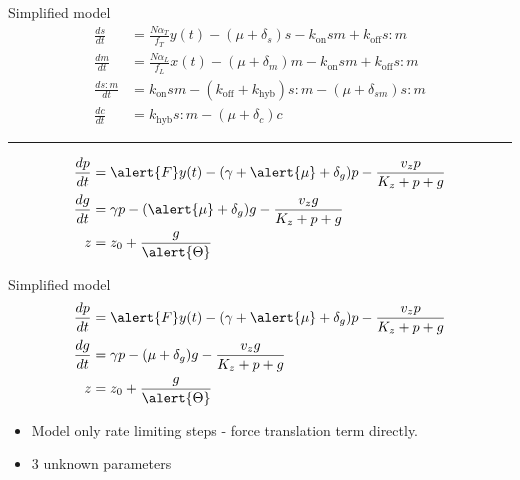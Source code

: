 \documentclass{beamer}
\newenvironment{greyedout}{\color{gray}}{\ignorespacesafterend}
\begin{document}
\small
\begin{frame}{Simplified model}
\begin{greyedout}
\begin{align*} 
\frac{ds}{dt} &= \frac{N\alpha_{T}}{f_{T}} y(t)-(\mu + \delta_{s})s -k_{\mathrm{on}}sm +k_{\mathrm{off}}s:m \\
\frac{dm}{dt} &=  \frac{N\alpha_{L}}{f_{L}}x(t)-(\mu + \delta_{m})m -k_{\mathrm{on}}sm +k_{\mathrm{off}}s:m  \\
\frac{ds:m}{dt} & = k_{\mathrm{on}}sm  - (k_{\mathrm{off}}+ k_{\mathrm{hyb}})s:m  -(\mu + \delta_{sm} )s:m \\
\frac{dc}{dt} & = k_{\mathrm{hyb}}s:m  -(\mu + \delta_{c})c  
\end{align*}
\end{greyedout}
\begin{center}
\rule{0.5\textwidth}{.4pt}
\end{center}
\begin{align*} 
\frac{dp}{dt} & = \alert{F}y(t)-(\gamma + \alert{\mu} + \delta_{g})p - \frac{v_{z}p}{K_{z}+p+g}   \\
\frac{dg}{dt} & = \gamma p - (\alert{\mu} + \delta_{g})g - \frac{v_{z}g}{K_{z}+p+g}  \\
z &= z_{0} +\frac{g}{\alert{\Theta}}  
\end{align*}
\end{frame}
\normalsize



\begin{frame}{Simplified model}
\begin{align}
\frac{dp}{dt} & = \alert{F}y(t)-(\gamma + \alert{\mu} + \delta_{g})p - \frac{v_{z}p}{K_{z}+p+g}   \\
\frac{dg}{dt} & = \gamma p - (\mu + \delta_{g})g - \frac{v_{z}g}{K_{z}+p+g}  \\
z &= z_{0} +\frac{g}{\alert{\Theta}} 
\end{align}
\begin{itemize}
\item  Model only rate limiting steps - force translation term directly.
\item 3 unknown parameters
\end{itemize}
\end{frame}
\end{document}

